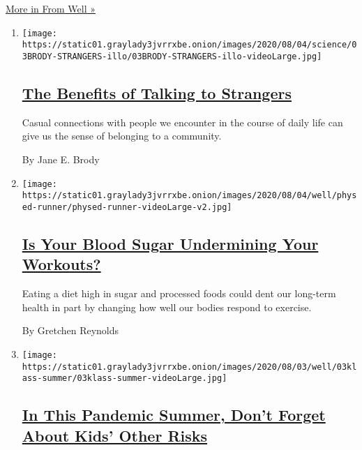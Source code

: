 \href{/section/well}{More in From Well »}

\begin{enumerate}
\def\labelenumi{\arabic{enumi}.}
\item
  \texttt{[image: https://static01.graylady3jvrrxbe.onion/images/2020/08/04/science/03BRODY-STRANGERS-illo/03BRODY-STRANGERS-illo-videoLarge.jpg]}

  \hypertarget{the-benefits-of-talking-to-strangers}{%
  \subsection{\texorpdfstring{\href{/2020/08/03/well/family/the-benefits-of-talking-to-strangers.html}{The
  Benefits of Talking to
  Strangers}}{The Benefits of Talking to Strangers}}\label{the-benefits-of-talking-to-strangers}}

  Casual connections with people we encounter in the course of daily
  life can give us the sense of belonging to a community.

  By Jane E. Brody
\item
  \texttt{[image: https://static01.graylady3jvrrxbe.onion/images/2020/08/04/well/physed-runner/physed-runner-videoLarge-v2.jpg]}

  \hypertarget{is-your-blood-sugar-undermining-your-workouts}{%
  \subsection{\texorpdfstring{\href{/2020/07/29/well/move/blood-sugar-diet-foods-workouts-exercise-muscles.html}{Is
  Your Blood Sugar Undermining Your
  Workouts?}}{Is Your Blood Sugar Undermining Your Workouts?}}\label{is-your-blood-sugar-undermining-your-workouts}}

  Eating a diet high in sugar and processed foods could dent our
  long-term health in part by changing how well our bodies respond to
  exercise.

  By Gretchen Reynolds
\item
  \texttt{[image: https://static01.graylady3jvrrxbe.onion/images/2020/08/03/well/03klass-summer/03klass-summer-videoLarge.jpg]}

  \hypertarget{in-this-pandemic-summer-dont-forget-about-kids-other-risks}{%
  \subsection{\texorpdfstring{\href{/2020/08/03/well/family/children-summer-safety.html}{In
  This Pandemic Summer, Don't Forget About Kids' Other
  Risks}}{In This Pandemic Summer, Don't Forget About Kids' Other Risks}}\label{in-this-pandemic-summer-dont-forget-about-kids-other-risks}}


\end{enumerate}
